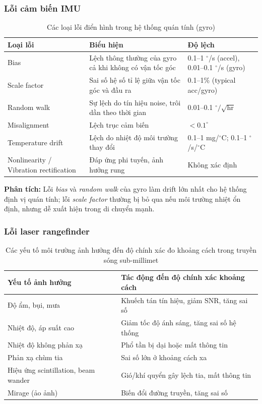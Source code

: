 \subsubsection{Lỗi cảm biến IMU}
    \begin{table}[h!]
\centering
\begin{tabular}{|l|p{6cm}|p{5cm}|}
\hline
\textbf{Loại lỗi} & \textbf{Biểu hiện} & \textbf{Độ lệch} \\
\hline
Bias & Lệch thông thường của gyro cả khi không có vận tốc góc & 0.1--1 $^\circ$/s (accel), 0.01--0.1 $^\circ$/s (gyro) \\
\hline
Scale factor & Sai số hệ số tỉ lệ giữa vận tốc góc và đầu ra & 0.1--1\% (typical acc/gyro) \\
\hline
Random walk & Sự lệch do tín hiệu noise, trôi dần theo thời gian & 0.01--0.1 $^\circ/\sqrt{\text{hr}}$ \\
\hline
Misalignment & Lệch trục cảm biến & $<0.1^\circ$ \\
\hline
Temperature drift & Lệch do nhiệt độ môi trường thay đổi & 0.1--1 mg/$^\circ$C; 0.1--1 $^\circ$/s/$^\circ$C \\
\hline
Nonlinearity / Vibration rectification & Đáp ứng phi tuyến, ảnh hưởng rung & Không xác định \\
\hline
\end{tabular}
\caption{Các loại lỗi điển hình trong hệ thống quán tính (gyro)}
\end{table}

\noindent\textbf{Phân tích:} Lỗi \textit{bias} và \textit{random walk} của gyro làm drift lớn nhất cho hệ thống định vị quán tính; lỗi \textit{scale factor} thường bị bỏ qua nếu môi trường nhiệt ổn định, nhưng dễ xuất hiện trong di chuyển mạnh.
\subsubsection{Lỗi laser rangefinder}

 \begin{table}[h!]
\centering
\begin{tabular}{|l|p{7cm}|}
\hline
\textbf{Yếu tố ảnh hưởng} & \textbf{Tác động đến độ chính xác khoảng cách} \\
\hline
Độ ẩm, bụi, mưa & Khuếch tán tín hiệu, giảm SNR, tăng sai số \\
\hline
Nhiệt độ, áp suất cao & Giảm tốc độ ánh sáng, tăng sai số hệ thống \\
\hline
Nhiệt độ không phản xạ & Phổ tần bị dại hoặc mất thông tin \\
\hline
Phản xạ chùm tia & Sai số lớn ở khoảng cách xa \\
\hline
Hiệu ứng scintillation, beam wander & Gió/khí quyển gây lệch tia, mất thông tin \\
\hline
Mirage (ảo ảnh) & Biến đổi đường truyền, tăng sai số \\
\hline
\end{tabular}
\caption{Các yếu tố môi trường ảnh hưởng đến độ chính xác đo khoảng cách trong truyền sóng sub-millimet}
\end{table}

